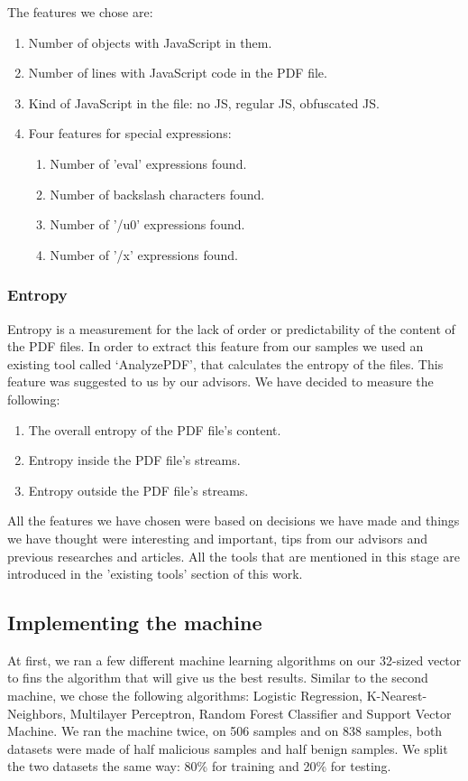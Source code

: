 \documentclass{article}
\begin{document}
\indent	The features we chose are:

\begin{enumerate}
	\item Number of objects with JavaScript in them.
	\item Number of lines with JavaScript code in the PDF file.
	\item Kind of JavaScript in the file: no JS, regular JS, obfuscated JS.
	\item Four features for special expressions:
	\begin{enumerate}
    	\item Number of 'eval' expressions found.
	    \item Number of backslash characters found.
		\item Number of '/u0' expressions found.
		\item Number of '/x' expressions found.
	\end{enumerate}
\end{enumerate}

\subsubsection{Entropy}
\indent	Entropy is a measurement for the lack of order or predictability of the content of the PDF files. In order to extract this feature from our samples we used an existing tool called ‘AnalyzePDF’, that calculates the entropy of the files. This feature was suggested to us by our advisors. We have decided to measure the following:

\begin{enumerate}
	\item The overall entropy of the PDF file's content.
	\item Entropy inside the PDF file's streams.
	\item Entropy outside the PDF file's streams.
\end{enumerate}

\indent	All the features we have chosen were based on decisions we have made and things we have thought were interesting and important, tips from our advisors and previous researches and articles. All the tools that are mentioned in this stage are introduced in the 'existing tools' section of this work.

\subsection{Implementing the machine}
\indent	At first, we ran a few different machine learning algorithms on our 32-sized vector to fins the algorithm that will give us the best results. Similar to the second machine, we chose the following algorithms: Logistic Regression, K-Nearest-Neighbors, Multilayer Perceptron, Random Forest Classifier and Support Vector Machine. We ran the machine twice, on 506 samples and on 838 samples, both datasets were made of half malicious samples and half benign samples. We split the two datasets the same way: 80\% for training and 20\% for testing.
\end{document}
